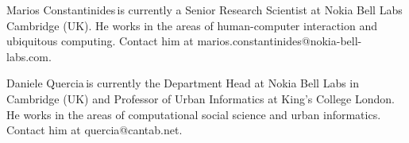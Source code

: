 \documentclass{IEEEcsmag}
\begin{document}
\begin{IEEEbiography}{Marios Constantinides}{\,}is currently a Senior Research Scientist at Nokia Bell Labs Cambridge (UK). He works in the areas of human-computer interaction and ubiquitous computing. Contact him at marios.constantinides@nokia-bell-labs.com.
\end{IEEEbiography}

\begin{IEEEbiography}{Daniele Quercia}{\,}is currently the Department Head at Nokia Bell Labs in Cambridge (UK) and Professor of Urban Informatics at King's College London. He works in the areas of computational social science and urban informatics. Contact him at quercia@cantab.net.
\end{IEEEbiography}
\end{document}
